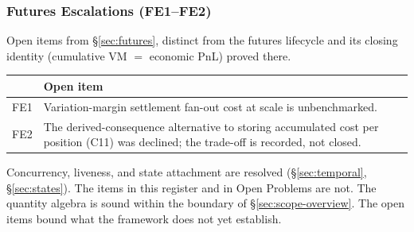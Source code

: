 \subsubsection{Futures Escalations (FE1--FE2)}

Open items from \S\ref{sec:futures}, distinct from the futures lifecycle and its closing identity (cumulative VM $=$ economic PnL) proved there.

\begin{longtable}{@{}p{0.5cm}p{12.6cm}@{}}
\toprule
& \textbf{Open item} \\
\midrule
\endhead
FE1 & Variation-margin settlement fan-out cost at scale is unbenchmarked. \\
FE2 & The derived-consequence alternative to storing accumulated cost per position (C11) was declined; the trade-off is recorded, not closed. \\
\bottomrule
\end{longtable}

\noindent Concurrency, liveness, and state attachment are resolved (\S\ref{sec:temporal}, \S\ref{sec:states}). The items in this register and in Open Problems are not. The quantity algebra is sound within the boundary of \S\ref{sec:scope-overview}. The open items bound what the framework does not yet establish.


